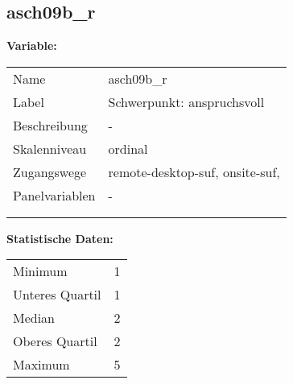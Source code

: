 	
	
	\subsection{asch09b\_r}
	\label{subSection:asch09b_r}

	\noindent\textbf{Variable:}\\
		\begin{tabular}{lL{11.3cm}}
			\label{tableVariable:asch09b_r}
			Name & asch09b\_r \\
			Label & Schwerpunkt: anspruchsvoll \\
			Beschreibung & - \\
			Skalenniveau & ordinal \\
			Zugangswege &
				remote-desktop-suf,
				onsite-suf,
 \\
			Panelvariablen & -
			 \\
			 \\
 \\
		\end{tabular}



		\vspace*{1 cm}
		\noindent\textbf{Statistische Daten:}\\
			\begin{tabular}{ll}
				\label{tableStatistics:asch09b_r}
					Minimum & 1 \\
					Unteres Quartil & 1 \\
					Median & 2 \\
					Oberes Quartil & 2 \\
					Maximum & 5 \\
			\end{tabular}



